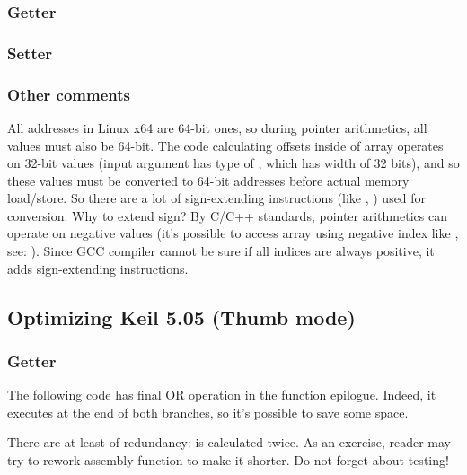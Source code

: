 \subsubsection{Getter}



\subsubsection{Setter}



\subsubsection{Other comments}

All addresses in Linux x64 are 64-bit ones, so during pointer arithmetics, all values must also be 64-bit.
The code calculating offsets inside of array operates on 32-bit values (input  argument has type of , which has width of 32 bits),
and so these values must be converted to 64-bit addresses before actual memory load/store.
So there are a lot of sign-extending instructions (like , ) used for conversion.
Why to extend sign? By C/C++ standards, pointer arithmetics can operate on negative values 
(it's possible to access array using negative index like , see: ).
Since GCC compiler cannot be sure if all indices are always positive, it adds sign-extending instructions.

\subsection{Optimizing Keil 5.05 (Thumb mode)}

\subsubsection{Getter}

The following code has final OR operation in the function epilogue.
Indeed, it executes at the end of both branches, so it's possible to save some space.



There are at least of redundancy:  is calculated twice.
As an exercise, reader may try to rework assembly function to make it shorter. Do not forget about testing!

